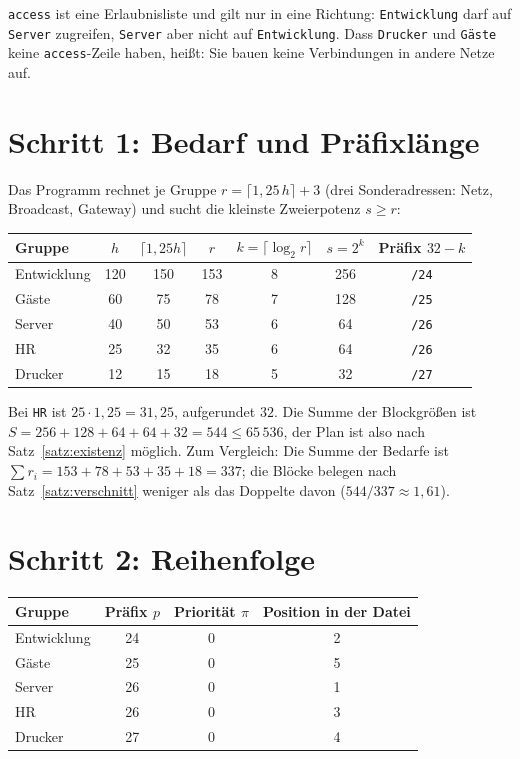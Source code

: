 \documentclass[a4paper,12pt, twoside]{report}
\theoremstyle{definition}
\begin{document}
\texttt{access} ist eine Erlaubnisliste und gilt nur in eine Richtung: \texttt{Entwicklung} darf auf \texttt{Server} zugreifen, \texttt{Server} aber nicht auf \texttt{Entwicklung}. Dass \texttt{Drucker} und \texttt{Gäste} keine \texttt{access}-Zeile haben, heißt: Sie bauen keine Verbindungen in andere Netze auf.

\section{Schritt 1: Bedarf und Präfixlänge}

Das Programm rechnet je Gruppe $r = \lceil 1{,}25\,h\rceil + 3$ (drei Sonderadressen: Netz, Broadcast, Gateway) und sucht die kleinste Zweierpotenz $s \ge r$:

\begin{center}
\small
\begin{tabular}{lcccccc}
\toprule
Gruppe & $h$ & $\lceil 1{,}25 h\rceil$ & $r$ & $k=\lceil\log_2 r\rceil$ & $s = 2^k$ & Präfix $32-k$ \\
\midrule
Entwicklung & 120 & 150 & 153 & 8 & 256 & \texttt{/24} \\
Gäste & 60 & 75 & 78 & 7 & 128 & \texttt{/25} \\
Server & 40 & 50 & 53 & 6 & 64 & \texttt{/26} \\
HR & 25 & 32 & 35 & 6 & 64 & \texttt{/26} \\
Drucker & 12 & 15 & 18 & 5 & 32 & \texttt{/27} \\
\bottomrule
\end{tabular}
\end{center}

Bei \texttt{HR} ist $25\cdot1{,}25 = 31{,}25$, aufgerundet $32$. Die Summe der Blockgrößen ist $S = 256+128+64+64+32 = 544 \le 65\,536$, der Plan ist also nach Satz~\ref{satz:existenz} möglich. Zum Vergleich: Die Summe der Bedarfe ist $\sum r_i = 153+78+53+35+18 = 337$; die Blöcke belegen nach Satz~\ref{satz:verschnitt} weniger als das Doppelte davon ($544/337 \approx 1{,}61$).

\section{Schritt 2: Reihenfolge}

\begin{center}
\small
\begin{tabular}{lccc}
\toprule
Gruppe & Präfix $p$ & Priorität $\pi$ & Position in der Datei \\
\midrule
Entwicklung & 24 & 0 & 2 \\
Gäste & 25 & 0 & 5 \\
Server & 26 & 0 & 1 \\
HR & 26 & 0 & 3 \\
Drucker & 27 & 0 & 4 \\
\bottomrule
\end{tabular}
\end{center}
\end{document}
